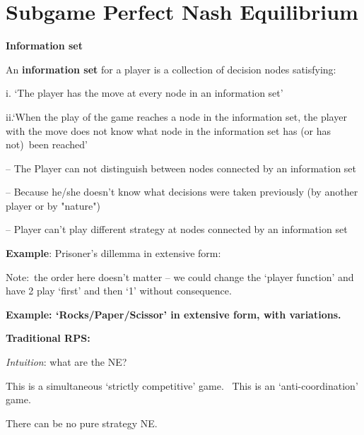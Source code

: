 \section{Subgame Perfect Nash Equilibrium}

\textbf{Information set }

An \textbf{information set} for a player is a collection of decision nodes
satisfying:


i. `The player has the move at every node in an information set'


ii.`When the play of the game reaches a node in the information set, the
player with the move does not know what node in the information set has (or
has not)\ been reached'


-- The Player can not distinguish between nodes connected by an information set

-- Because he/she doesn't know what decisions were taken previously (by
another player or by "nature")

-- Player can't play different strategy at nodes connected by an information
set


\textbf{Example}: Prisoner's dillemma in extensive form:


Note:\ the order here doesn't matter -- we could change the `player
function' and have 2 play `first' and then `1' without consequence.


\textbf{Example: `Rocks/Paper/Scissor' in extensive
form, with variations.}

\textbf{Traditional RPS:\bigskip }

 \textit{Intuition}: what are the
NE?

This is a simultaneous `strictly competitive' game. \ This is an
`anti-coordination' game.

There can be no pure strategy NE.

